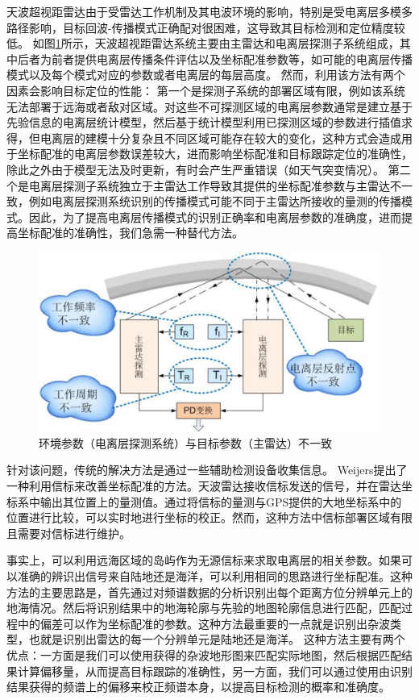 天波超视距雷达由于受雷达工作机制及其电波环境的影响，特别是受电离层多模多路径影响，目标回波-传播模式正确配对很困难，这导致其目标检测和定位精度较低。
如图\ref{fig:pdproblem}所示，天波超视距雷达系统主要由主雷达和电离层探测子系统组成，其中后者为前者提供电离层传播条件评估以及坐标配准参数等，如可能的电离层传播模式以及每个模式对应的参数或者电离层的每层高度。
然而，利用该方法有两个因素会影响目标定位的性能：
第一个是探测子系统的部署区域有限，例如该系统无法部署于远海或者敌对区域。对这些不可探测区域的电离层参数通常是建立基于先验信息的电离层统计模型，然后基于统计模型利用已探测区域的参数进行插值求得，但电离层的建模十分复杂且不同区域可能存在较大的变化，这种方式会造成用于坐标配准的电离层参数误差较大，进而影响坐标配准和目标跟踪定位的准确性，除此之外由于模型无法及时更新，有时会产生严重错误（如天气突变情况）。
第二个是电离层探测子系统独立于主雷达工作导致其提供的坐标配准参数与主雷达不一致，例如电离层探测系统识别的传播模式可能不同于主雷达所接收的量测的传播模式。因此，为了提高电离层传播模式的识别正确率和电离层参数的准确度，进而提高坐标配准的准确性，我们急需一种替代方法。

\begin{figure}[hbt]
	\centering
	\includegraphics[width=13.5cm]{figures/introduction/pdproblem}
	\caption{环境参数（电离层探测系统）与目标参数（主雷达）不一致}
	\label{fig:pdproblem}
\end{figure}

针对该问题，传统的解决方法是通过一些辅助检测设备收集信息。
Weijers提出了一种利用信标来改善坐标配准的方法。天波雷达接收信标发送的信号，并在雷达坐标系中输出其位置上的量测值。通过将信标的量测与GPS提供的大地坐标系中的位置进行比较，可以实时地进行坐标的校正。然而，这种方法中信标部署区域有限且需要对信标进行维护。

事实上，可以利用远海区域的岛屿作为无源信标来求取电离层的相关参数。如果可以准确的辨识出信号来自陆地还是海洋，可以利用相同的思路进行坐标配准。这种方法的主要思路是，首先通过对频谱数据的分析识别出每个距离方位分辨单元上的地海情况。然后将识别结果中的地海轮廓与先验的地图轮廓信息进行匹配，匹配过程中的偏差可以作为坐标配准的参数。这种方法最重要的一点就是识别出杂波类型，也就是识别出雷达的每一个分辨单元是陆地还是海洋。
这种方法主要有两个优点：一方面是我们可以使用获得的杂波地形图来匹配实际地图，然后根据匹配结果计算偏移量，从而提高目标跟踪的准确性，另一方面，我们可以通过使用由识别结果获得的频谱上的偏移来校正频谱本身，以提高目标检测的概率和准确度。

